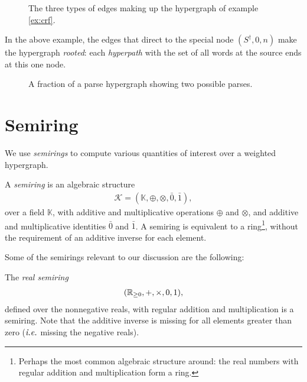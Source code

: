   \begin{figure}[h]
    \center
    \begin{tikzpicture}[scale=.6]
      
    \end{tikzpicture}
    \caption{The three types of edges making up the hypergraph of example \ref{ex:crf}.}
    \label{fig:edges}
  \end{figure}

  In the above example, the edges that direct to the special node $(S^{\dagger}, 0, n)$ make the hypergraph \textit{rooted}: each \textit{hyperpath} with the set of all words at the source ends at this one node.

\begin{figure}[h]
  \center
  \begin{tikzpicture}[scale=.6]
    
  \end{tikzpicture}
  \caption{A fraction of a parse hypergraph showing two possible parses.}
  \label{fig:hypergraph}
\end{figure}


\section{Semiring}
  We use \textit{semirings} to compute various quantities of interest over a weighted hypergraph.

  \begin{definition}{}
    A \textit{semiring} is an algebraic structure
    \begin{align*}
      \mathcal{K} = ( \mathbb{K}, \oplus, \otimes, \bar{0}, \bar{1} ),
    \end{align*}
    over a field $\mathbb{K}$, with additive and multiplicative operations $\oplus$ and $\otimes$, and additive and multiplicative identities $\bar{0}$ and $\bar{1}$. A semiring is equivalent to a ring\footnote{Perhaps the most common algebraic structure around: the real numbers with regular addition and multiplication form a ring.}, without the requirement of an additive inverse for each element.
  \end{definition}

  Some of the semirings relevant to our discussion are the following:
  \begin{example}{}
    The \textit{real semiring}
    \begin{align*}
      ( \reals_{\geq 0}, +, \times, 0, 1 ),
    \end{align*}
    defined over the nonnegative reals, with regular addition and multiplication is a semiring. Note that the additive inverse is missing for all elements greater than zero ($\ie$ missing the negative reals).
  \end{example}

